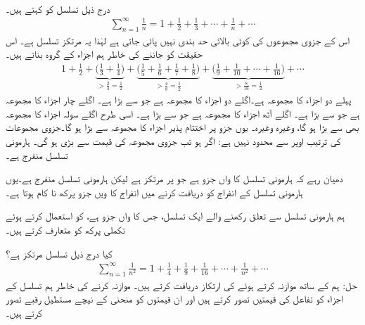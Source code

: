 \\
درج ذیل تسلسل کو  کہتے ہیں۔
\begin{align*}
\sum_{n=1}^{\infty}\frac{1}{n}=1+\frac{1}{2}+\frac{1}{3}+\cdots+\frac{1}{n}+\cdots
\end{align*}
اس کے جزوی مجموعوں کی کوئی بالائی حد بندی نہیں پائی جاتی ہے لہٰذا یہ  مرتکز  تسلسل ہے۔ اس حقیقت کو جاننے کی خاطر ہم اجزاء کے گروہ بناتے ہیں۔
\begin{align*}
1+\frac{1}{2}+\underbrace{\big(\frac{1}{3}+\frac{1}{4}\big)}_{>\tfrac{2}{4}=\tfrac{1}{2}}+\underbrace{\big(\frac{1}{5}+\frac{1}{6}+\frac{1}{7}+\frac{1}{8}\big)}_{>\tfrac{4}{8}=\tfrac{1}{2}}+\underbrace{\big(\frac{1}{9}+\frac{1}{10}+\cdots+\frac{1}{16}\big)}_{>\tfrac{8}{16}=\tfrac{1}{2}}+\cdots
\end{align*}
پہلے دو اجزاء کا مجموعہ  ہے۔اگلے دو اجزاء کا مجموعہ  ہے جو  سے بڑا ہے۔ اگلے چار اجزاء کا مجموعہ  ہے جو  سے بڑا ہے۔ اگلے آٹھ اجزاء کا مجموعہ
  ہے جو   سے بڑا ہے۔ اسی طرح اگلے سولہ اجزاء کا مجموعہ بھی  سے بڑا ہو گا، وغیرہ وغیرہ۔ یوں جزو  پر اختتام پذیر   اجزاء کا مجموعہ  سے بڑا ہو گا۔جزوی مجموعات کی ترتیب اوپر سے محدود نہیں ہے: اگر  ہو تب جزوی مجموعہ  کی قیمت  سے بڑی ہو گی۔ ہارمونی تسلسل منفرج ہے۔

دھیان رہے کہ ہارمونی تسلسل کا  واں جزو  ہے جو  پر مرتکز ہے لیکن ہارمونی تسلسل منفرج ہے۔یوں ہارمونی تسلسل کے انفراج کو دریافت کرنے میں انفراج کا  ویں جزو پرکھ  نا کام  ہوتا ہے۔

ہم ہارمونی تسلسل سے تعلق رکھنے والے ایک تسلسل، جس کا  واں جزو  ہے، کو استعمال کرتے ہوئے تکملی پرکھ کو متعارف کرتے ہیں۔

کیا درج ذیل تسلسل مرتکز ہے؟
\begin{align*}
\sum_{n=1}^{\infty}\frac{1}{n^2}=1+\frac{1}{4}+\frac{1}{9}+\frac{1}{16}+\cdots+\frac{1}{n^2}+\cdots
\end{align*}
حل:\quad
ہم  کے ساتھ موازنہ کرتے ہوئے  کی ارتکاز دریافت کرتے ہیں۔ موازنہ کرنے کی خاطر ہم تسلسل کے اجزاء کو تفاعل  کی قیمتیں تصور کرتے ہیں اور ان قیمتوں کو منحنی  کے نیچے مستطیل رقبے تصور کرتے ہیں۔

